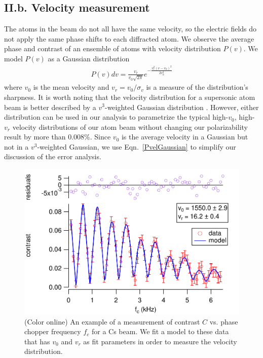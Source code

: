 \documentclass[twocolumn,prl,showpacs,superscriptaddress]{revtex4-1}   %
\newcommand{\eqnref}[1]{Eqn.~\eqref{#1}}
\begin{document}
\subsection{II.b. Velocity measurement}

The atoms in the beam do not all have the same velocity, so the electric fields do not apply the same phase shifts to each diffracted atom.
We observe the average phase and contrast of an ensemble of atoms with velocity distribution $P(v)$. 
We model $P(v)$ as a Gaussian distribution
\begin{align}
	P(v)dv = \frac{v_r}{v_0\sqrt{2\pi}}e^{-\frac{v_r^2(v-v_0)^2}{2v_0^2}}
	\label{PvelGaussian}
\end{align}
where $v_0$ is the mean velocity and $v_r = v_0/\sigma_v$ is a measure of the distribution's sharpness. It is worth noting that the velocity distribution for a supersonic atom beam is better described by a $v^3$-weighted Gaussian distribution
\cite{Berman1997}. However, either distribution can be used in our analysis to parametrize the typical high-$v_0$, high-$v_r$ velocity distributions of our atom beam without changing our polarizability result by more than 0.008\%. Since $v_0$ is the average velocity in a Gaussian but not in a $v^3$-weighted Gaussian, we use \eqnref{PvelGaussian} to simplify our discussion of the error analysis. 


\begin{figure}
\includegraphics[width=\linewidth,keepaspectratio]{CvCF_150420_ca.pdf}
\caption{\label{CvCFExample}(Color online) An example of a measurement of contrast $C$ vs. phase chopper frequency $f_c$ for a Cs beam. We fit a model to these data that has $v_0$ and $v_r$ as fit parameters in order to measure the velocity distribution.}
\end{figure}
\end{document}

